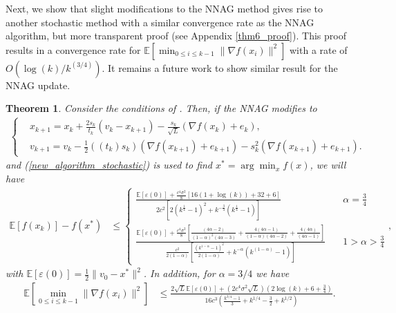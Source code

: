 \documentclass{article}
\theoremstyle{plain}
\newtheorem{theorem}{Theorem}[section]
\theoremstyle{definition}
\theoremstyle{remark}
\begin{document}
Next, we show that slight modifications to the NNAG method gives rise to another stochastic method with a similar convergence rate as the NNAG algorithm, but more transparent proof (see Appendix \ref{thm6_proof}). This proof results in a convergence rate for $\mathbb E\left[\min_{0\leq i\leq k-1}\|\nabla f(x_i)\|^2 \right]$ with a rate of $O(\log(k)/k^{(3/4)})$. It remains a future work to show similar result for the NNAG update.
\begin{theorem}\label{Theorem5}
   Consider the conditions of . Then, if the NNAG modifies to
   \begin{align}\label{new_algorithm_stochastic}
   \left\{ \begin{array}{ll}
    &x_{k+1}   =    x_{k} + \frac{2s_k}{t_k}(v_k-x_{k+1})-\frac{s_k}{\sqrt{L}}(\nabla f(x_k)+e_k),\\
     &v_{k+1}    = v_k -\tfrac{1}{2}((t_k)s_k)(\nabla f(x_{k+1})+e_{k+1})-s_k^2(\nabla f(x_{k+1})+e_{k+1}). 
    \end{array}\right.
\end{align}
and (\ref{new_algorithm_stochastic}) is used to find $x^*=\arg\min_x f(x)$, we will have
    \begin{align}\label{conv_rate1_them6}
    \mathbb E[f(x_k)]-f(x^*)&\leq \left\{\begin{array}{lr}
         \frac{\mathbb E[\varepsilon (0)]+\frac{c^4\sigma^2}{8}\left[16(1+\log(k))+32+6\right]}{2c^2\left[2(k^{\frac{1}{4}}-1)^2+k^{-\frac{3}{4}}(k^{\frac{1}{4}}-1)\right]} & \quad \alpha=\frac{3}{4} \\
          \frac{\mathbb E[\varepsilon (0)]+\frac{c^4\sigma^2}{8}\left[\frac{(4\alpha -2)}{(1-\alpha)^2(4\alpha-3)}+\frac{4(4\alpha -1)}{(1-\alpha)(4\alpha -2)}+\frac{4(4\alpha )}{(4\alpha -1)}\right]}{\frac{c^2}{2(1-\alpha)}\left[\frac{(k^{1-\alpha}-1)^2}{2(1-\alpha)}+k^{-\alpha}(k^{(1-\alpha)}-1)\right]}& \quad 1>\alpha>\frac{3}{4}
    \end{array}\right.,
\end{align}
with $\mathbb E[\varepsilon (0)]=\frac{1}{2}\|v_0-x^*\|^2$. In addition, for $\alpha = 3/4$ we have
\begin{align}\label{conv_rate2_them6}
    \mathbb E\left[\min_{0\leq i\leq k-1}\|\nabla f(x_i)\|^2 \right] &\leq \frac{2\sqrt{L}\mathbb E[\varepsilon (0)]+(2c^4\sigma^2\sqrt{L})(2\log (k)+6+\frac{3}{4})}{16c^3\left( \frac{k^{3/4}-1}{3} +k^{1/4}-\frac{3}{2}+k^{1/2}\right)}.
\end{align}
\end{theorem}
\end{document}
